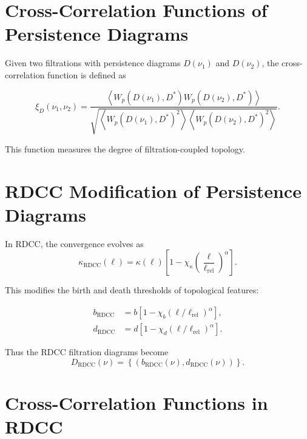 \documentclass[11pt,a4paper]{article}
\begin{document}
\section{Cross-Correlation Functions of Persistence Diagrams}

Given two filtrations with persistence diagrams $D(\nu_{1})$ and $D(\nu_{2})$, the 
cross-correlation function is defined as

\begin{equation}
    \xi_{D}(\nu_{1}, \nu_{2})
    = \frac{
        \left\langle
            W_{p}(D(\nu_{1}), D^{*})
            W_{p}(D(\nu_{2}), D^{*})
        \right\rangle
      }{
        \sqrt{
            \left\langle W_{p}(D(\nu_{1}), D^{*})^{2} \right\rangle
            \left\langle W_{p}(D(\nu_{2}), D^{*})^{2} \right\rangle
        }
      }.
\end{equation}

This function measures the degree of filtration-coupled topology.
\section{RDCC Modification of Persistence Diagrams}

In RDCC, the convergence evolves as
\begin{equation}
    \kappa_{\mathrm{RDCC}}(\ell)
    = \kappa(\ell)
      \left[
        1 - \chi_{\kappa}
        \left(\frac{\ell}{\ell_{\mathrm{rel}}}\right)^{\alpha}
      \right].
\end{equation}

This modifies the birth and death thresholds of topological features:

\begin{align}
    b_{\mathrm{RDCC}} &= b \left[ 1 - \chi_{b} (\ell/\ell_{\mathrm{rel}})^{\alpha} \right], \\
    d_{\mathrm{RDCC}} &= d \left[ 1 - \chi_{d} (\ell/\ell_{\mathrm{rel}})^{\alpha} \right].
\end{align}

Thus the RDCC filtration diagrams become
\begin{equation}
    D_{\mathrm{RDCC}}(\nu)
    = \left\{
        (b_{\mathrm{RDCC}}(\nu), d_{\mathrm{RDCC}}(\nu))
      \right\}.
\end{equation}
\section{Cross-Correlation Functions in RDCC}
\end{document}
